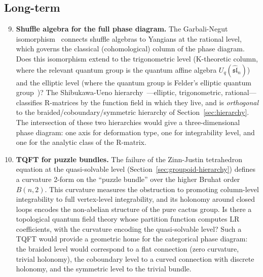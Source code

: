 \begin{enumerate}[label=\textbf{Q\arabic*.}, ref=Q\arabic*, leftmargin=3em]
\end{enumerate}


\subsection{Long-term}

\begin{enumerate}[label=\textbf{Q\arabic*.}, ref=Q\arabic*, leftmargin=3em]
\setcounter{enumi}{8}

\item \label{q:shuffle-full}
\textbf{Shuffle algebra for the full phase diagram.}
The Garbali-Negut isomorphism~\cite{garbali-negut-2025} connects
shuffle algebras to Yangians at the rational level, which governs the
classical (cohomological) column of the phase diagram.  Does this
isomorphism extend to the trigonometric level (K-theoretic column,
where the relevant quantum group is the quantum affine algebra
$U_q(\widehat{\mathfrak{sl}}_n)$) and the elliptic level (where the
quantum group is Felder's elliptic quantum
group~\cite{felder-1995})?  The Shibukawa-Ueno
hierarchy~\cite{shibukawa-ueno}---elliptic, trigonometric,
rational---classifies R-matrices by the function field in which they
live, and is \emph{orthogonal} to the braided/coboundary/symmetric
hierarchy of Section~\ref{sec:hierarchy}.  The intersection of these
two hierarchies would give a three-dimensional phase diagram: one axis
for deformation type, one for integrability level, and one for the
analytic class of the R-matrix.

\item \label{q:tqft}
\textbf{TQFT for puzzle bundles.}
The failure of the Zinn-Justin tetrahedron equation at the
quasi-solvable level (Section~\ref{sec:groupoid-hierarchy}) defines a
curvature 2-form on the ``puzzle bundle'' over the higher Bruhat order
$B(n,2)$.  This curvature measures the obstruction to promoting
column-level integrability to full vertex-level integrability, and its
holonomy around closed loops encodes the non-abelian structure of the
pure cactus group.  Is there a topological quantum field theory whose
partition function computes LR coefficients, with the curvature
encoding the quasi-solvable level?  Such a TQFT would provide a
geometric home for the categorical phase diagram: the braided level
would correspond to a flat connection (zero curvature, trivial
holonomy), the coboundary level to a curved connection with discrete
holonomy, and the symmetric level to the trivial bundle.


\end{enumerate}

